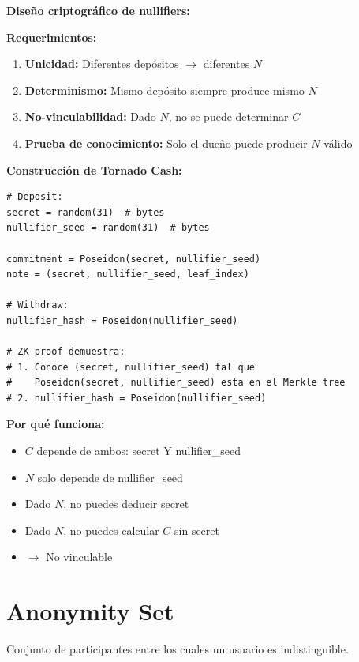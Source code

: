 \documentclass[11pt,a4paper,twoside]{book}
\begin{document}
\begin{mathnote}
\textbf{Dise\~no criptogr\'afico de nullifiers:}

\textbf{Requerimientos:}
\begin{enumerate}
    \item \textbf{Unicidad:} Diferentes dep\'ositos $\to$ diferentes $N$
    \item \textbf{Determinismo:} Mismo dep\'osito siempre produce mismo $N$
    \item \textbf{No-vinculabilidad:} Dado $N$, no se puede determinar $C$
    \item \textbf{Prueba de conocimiento:} Solo el due\~no puede producir $N$ v\'alido
\end{enumerate}

\textbf{Construcci\'on de Tornado Cash:}
\begin{lstlisting}[style=python]
# Deposit:
secret = random(31)  # bytes
nullifier_seed = random(31)  # bytes

commitment = Poseidon(secret, nullifier_seed)
note = (secret, nullifier_seed, leaf_index)

# Withdraw:
nullifier_hash = Poseidon(nullifier_seed)

# ZK proof demuestra:
# 1. Conoce (secret, nullifier_seed) tal que
#    Poseidon(secret, nullifier_seed) esta en el Merkle tree
# 2. nullifier_hash = Poseidon(nullifier_seed)
\end{lstlisting}

\textbf{Por qu\'e funciona:}
\begin{itemize}
    \item $C$ depende de ambos: secret Y nullifier\_seed
    \item $N$ solo depende de nullifier\_seed
    \item Dado $N$, no puedes deducir secret
    \item Dado $N$, no puedes calcular $C$ sin secret
    \item $\to$ No vinculable
\end{itemize}
\end{mathnote}

\section{Anonymity Set}

\begin{definition}
Conjunto de participantes entre los cuales un usuario es indistinguible.
\end{definition}
\end{document}
